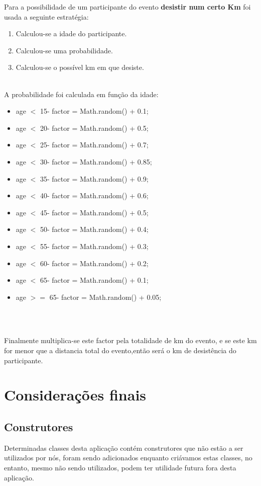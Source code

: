 \documentclass[12pt,notitlepage]{article}
\begin{document}
Para a possibilidade de um participante do evento  \textbf{desistir num certo Km} foi usada a seguinte estratégia:
\begin{enumerate}
\item Calculou-se a idade do participante.
\item Calculou-se uma probabilidade.
\item Calculou-se o possível km em que desiste.
\end{enumerate}~\\
A probabilidade foi calculada em função da idade:
\begin{itemize}
\item age $<$ 15- factor = Math.random() + 0.1;
\item age $<$ 20- factor = Math.random() + 0.5;
\item age $<$ 25- factor = Math.random() + 0.7;
\item age $<$ 30- factor = Math.random() + 0.85;
\item age $<$ 35- factor = Math.random() + 0.9;
\item age $<$ 40- factor = Math.random() + 0.6;
\item age $<$ 45- factor = Math.random() + 0.5;
\item age $<$ 50- factor = Math.random() + 0.4;
\item age $<$ 55- factor = Math.random() + 0.3;
\item age $<$ 60- factor = Math.random() + 0.2;
\item age $<$ 65- factor = Math.random() + 0.1;
\item age $>=$ 65- factor = Math.random() + 0.05;
\end{itemize}~\\~

Finalmente multiplica-se este factor pela totalidade de km do evento, e se este km for menor que a distancia total do evento,então será o km de desistência do participante.

\section{Considerações finais}

\subsection{Construtores}
Determinadas classes desta aplicação contém construtores que não estão a ser utilizados por nós, foram sendo adicionados enquanto criávamos estas classes, no entanto, mesmo não sendo utilizados, podem ter utilidade futura fora desta aplicação.
\end{document}
